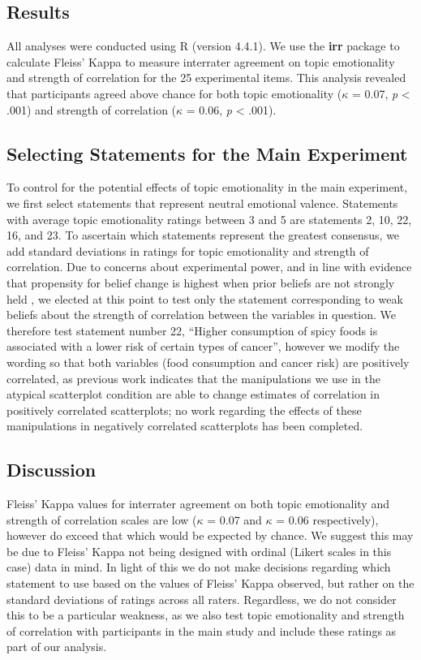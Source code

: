 \documentclass[manuscript,screen,review]{acmart}
\begin{document}
\subsection{Results}\label{sec-results-pre}

All analyses were conducted using R (version 4.4.1). We use the
\textbf{irr} package to calculate Fleiss' Kappa to measure interrater
agreement on topic emotionality and strength of correlation for the 25
experimental items. This analysis revealed that participants agreed
above chance for both topic emotionality (\(\kappa\) = 0.07, \emph{p}
\textless{} .001) and strength of correlation (\(\kappa\) = 0.06,
\emph{p} \textless{} .001).

\subsection{Selecting Statements for the Main
Experiment}\label{sec-selecting-statements}

To control for the potential effects of topic emotionality in the main
experiment, we first select statements that represent neutral emotional
valence. Statements with average topic emotionality ratings between 3
and 5 are statements 2, 10, 22, 16, and 23. To ascertain which
statements represent the greatest consensus, we add standard deviations
in ratings for topic emotionality and strength of correlation. Due to
concerns about experimental power, and in line with evidence that
propensity for belief change is highest when prior beliefs are not
strongly held \citep{xiong_2022}, we elected at this point to test only
the statement corresponding to weak beliefs about the strength of
correlation between the variables in question. We therefore test
statement number 22, ``Higher consumption of spicy foods is associated
with a lower risk of certain types of cancer'', however we modify the
wording so that both variables (food consumption and cancer risk) are
positively correlated, as previous work indicates that the manipulations
we use in the atypical scatterplot condition are able to change
estimates of correlation in positively correlated scatterplots; no work
regarding the effects of these manipulations in negatively correlated
scatterplots has been completed.

\subsection{Discussion}\label{sec-discussion-pre}

Fleiss' Kappa values for interrater agreement on both topic emotionality
and strength of correlation scales are low (\(\kappa\) = 0.07 and
\(\kappa\) = 0.06 respectively), however do exceed that which would be
expected by chance. We suggest this may be due to Fleiss' Kappa not
being designed with ordinal (Likert scales in this case) data in mind.
In light of this we do not make decisions regarding which statement to
use based on the values of Fleiss' Kappa observed, but rather on the
standard deviations of ratings across all raters. Regardless, we do not
consider this to be a particular weakness, as we also test topic
emotionality and strength of correlation with participants in the main
study and include these ratings as part of our analysis.
\end{document}
